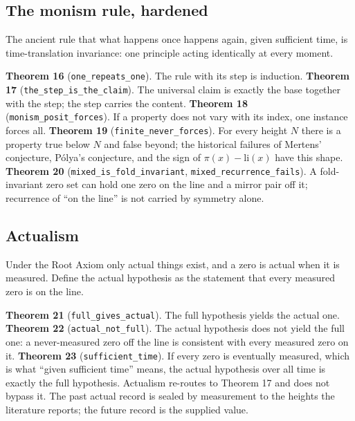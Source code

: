 \documentclass[10pt]{article}
\begin{document}
\hypertarget{the-monism-rule-hardened}{%
\subsection{The monism rule, hardened}\label{the-monism-rule-hardened}}

The ancient rule that what happens once happens again, given sufficient
time, is time-translation invariance: one principle acting identically
at every moment.

\textbf{Theorem 16} (\texttt{one\_repeats\_one}). The rule with its step
is induction. \textbf{Theorem 17} (\texttt{the\_step\_is\_the\_claim}).
The universal claim is exactly the base together with the step; the step
carries the content. \textbf{Theorem 18}
(\texttt{monism\_posit\_forces}). If a property does not vary with its
index, one instance forces all. \textbf{Theorem 19}
(\texttt{finite\_never\_forces}). For every height \(N\) there is a
property true below \(N\) and false beyond; the historical failures of
Mertens' conjecture, Pólya's conjecture, and the sign of
\(\pi(x) - \mathrm{li}(x)\) have this shape. \textbf{Theorem 20}
(\texttt{mixed\_is\_fold\_invariant},
\texttt{mixed\_recurrence\_fails}). A fold-invariant zero set can hold
one zero on the line and a mirror pair off it; recurrence of ``on the
line'' is not carried by symmetry alone.

\hypertarget{actualism}{%
\subsection{Actualism}\label{actualism}}

Under the Root Axiom only actual things exist, and a zero is actual when
it is measured. Define the actual hypothesis as the statement that every
measured zero is on the line.

\textbf{Theorem 21} (\texttt{full\_gives\_actual}). The full hypothesis
yields the actual one. \textbf{Theorem 22} (\texttt{actual\_not\_full}).
The actual hypothesis does not yield the full one: a never-measured zero
off the line is consistent with every measured zero on it.
\textbf{Theorem 23} (\texttt{sufficient\_time}). If every zero is
eventually measured, which is what ``given sufficient time'' means, the
actual hypothesis over all time is exactly the full hypothesis.
Actualism re-routes to Theorem 17 and does not bypass it. The past
actual record is sealed by measurement to the heights the literature
reports; the future record is the supplied value.
\end{document}
